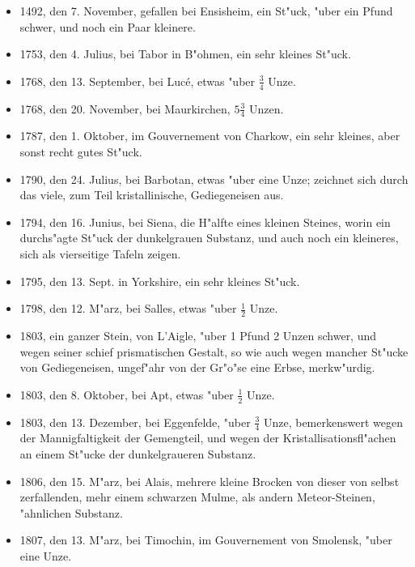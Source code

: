 \documentclass[a4paper, 11pt, oneside, polutonikogreek, german]{article}
\begin{document}
\subsubsection*{}
\begin{itemize}
    \item 1492, den 7. November, gefallen bei Ensisheim, ein St"uck, "uber ein Pfund schwer, und noch ein Paar kleinere.
    \item 1753, den 4. Julius, bei Tabor in B"ohmen, ein sehr kleines St"uck.
    \item 1768, den 13. September, bei Lucé, etwas "uber $\mathfrak{\frac{3}{4}}$ Unze.
    \item 1768, den 20. November, bei Maurkirchen, $\mathfrak{5\frac{3}{4}}$ Unzen.
    \item 1787, den 1. Oktober, im Gouvernement von Charkow, ein sehr kleines, aber sonst recht gutes St"uck.
    \item 1790, den 24. Julius, bei Barbotan, etwas "uber eine Unze; zeichnet sich durch das viele, zum Teil kristallinische, Gediegeneisen aus.
    \item 1794, den 16. Junius, bei Siena, die H"alfte eines kleinen Steines, worin ein durchs"agte St"uck der dunkelgrauen Substanz, und auch noch ein kleineres, sich als vierseitige Tafeln zeigen.
    \item 1795, den 13. Sept. in Yorkshire, ein sehr kleines St"uck.
    \item 1798, den 12. M"arz, bei Salles, etwas "uber $\mathfrak{\frac{1}{2}}$ Unze.
    \item 1803, ein ganzer Stein, von L'Aigle, "uber 1 Pfund 2 Unzen schwer, und wegen seiner schief prismatischen Gestalt, so wie auch wegen mancher St"ucke von Gediegeneisen, ungef"ahr von der Gr"o"se eine Erbse, merkw"urdig.
    \item 1803, den 8. Oktober, bei Apt, etwas "uber $\mathfrak{\frac{1}{2}}$ Unze.
    \item 1803, den 13. Dezember, bei Eggenfelde, "uber $\mathfrak{\frac{3}{4}}$ Unze, bemerkenswert wegen der Mannigfaltigkeit der Gemengteil, und wegen der Kristallisationsfl"achen an einem St"ucke der dunkelgraueren Substanz.
    \item 1806, den 15. M"arz, bei Alais, mehrere kleine Brocken von dieser von selbst zerfallenden, mehr einem schwarzen Mulme, als andern Meteor-Steinen, "ahnlichen Substanz.
    \item 1807, den 13. M"arz, bei Timochin, im Gouvernement von Smolensk, "uber eine Unze.

\end{itemize}
\end{document}

